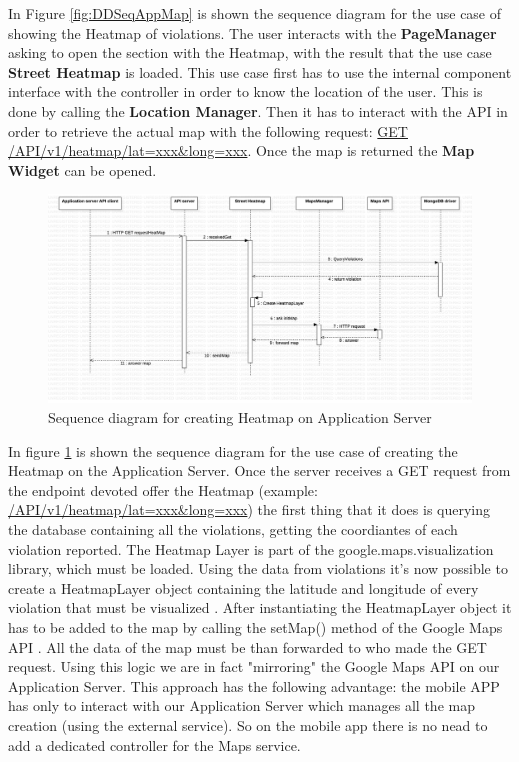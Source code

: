 In Figure \ref{fig:DDSeqAppMap} is shown the sequence diagram for the use case of showing the Heatmap of violations.
The user interacts with the \textbf{PageManager} asking to open the section with the Heatmap, with the result that the use case \textbf{Street Heatmap} is loaded. This use case first has to use the internal component interface with the controller in order to know the location of the user. This is done by calling the \textbf{Location Manager}. Then it has to interact with the API in order to retrieve the actual map with the following request: \url{GET} \url{/API/v1/heatmap/lat=xxx&long=xxx}.
Once the map is returned the \textbf{Map Widget} can be opened.

\begin{figure}[H]
\centering
\includegraphics[width=\textwidth]{Images/DDSeqSeverMap.png}
\caption{\label{fig:DDSeqSeverMap} Sequence diagram for creating Heatmap on Application Server}
\end{figure}

In figure \ref{fig:DDSeqSeverMap} is shown the sequence diagram for the use case of creating the Heatmap on the Application Server.
Once the server receives a GET request from the endpoint devoted offer the Heatmap (example: \url{/API/v1/heatmap/lat=xxx&long=xxx}) the first thing that it does is querying the database containing all the violations, getting the coordiantes of each violation reported. The Heatmap Layer is part of the \textcolor{poliblue}{google.maps.visualization} library, which must be loaded. Using the data from violations it's now possible to create a \textcolor{poliblue}{HeatmapLayer} object containing the latitude and longitude of every violation that must be visualized \cite{GMapsHeat}. After instantiating the \textcolor{poliblue}{HeatmapLayer} object it has to be added to the map by calling the \textcolor{poliblue}{setMap()} method of the Google Maps API \cite{GMapsHeat}. All the data of the map must be than forwarded to who made the GET request.
Using this logic we are in fact "mirroring" the Google Maps API on our Application Server. This approach has the following advantage: the mobile APP has only to interact with our Application Server which manages all the map creation (using the external service). So on the mobile app there is no nead to add a dedicated controller for the Maps service.

